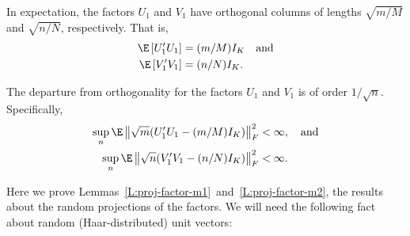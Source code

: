 \begin{lemma}\label{L:proj-factor-m1}
    In expectation, the factors $U_1$ and $V_1$ have orthogonal columns of
    lengths $\sqrt{m/M}$ and $\sqrt{n/N}$, respectively.  That is,
    \begin{align*}
        \E \left[ U_1' U_1 \right] &= (m/M) I_K \quad \text{and} \\
        \E \left[ V_1' V_1 \right] &= (n/N) I_K.
    \end{align*}
\end{lemma}

\begin{lemma}\label{L:proj-factor-m2}
    The departure from orthogonality for the factors $U_1$ and $V_1$ is of 
    order $1/\sqrt{n}$.  Specifically,
    \begin{align*}
        \sup_{n} \E \left\| \sqrt{m}( U_1' U_1 - (m/M) I_K) \right\|_F^2 
            &< \infty, \quad \text{and} \\
        \sup_{n} \E \left\| \sqrt{n}( V_1' V_1 - (n/N) I_K ) \right\|_F^2
            &< \infty.
    \end{align*}
\end{lemma}

Here we prove Lemmas~\ref{L:proj-factor-m1}~and~\ref{L:proj-factor-m2}, the
results about the random projections of the factors. We will need the following
fact about random (Haar-distributed) unit vectors:
